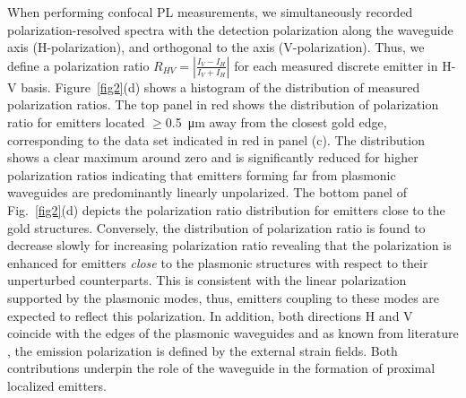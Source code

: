 \documentclass[journal=nalefd,manuscript=letter]{achemso}
\begin{document}
When performing confocal PL measurements, we simultaneously recorded polarization-resolved spectra with the detection polarization along the waveguide axis (H-polarization), and orthogonal to the axis (V-polarization).  Thus, we define a polarization ratio $R_{HV} = |\frac{I_V - I_H}{I_V + I_H}|$ for each measured discrete emitter in H-V basis.
Figure~\ref{fig2}(d) shows a histogram of the distribution of measured polarization ratios.
The top panel in red shows the distribution of polarization ratio for emitters located $\geq$\SI{0.5}{\micro\meter} away from the closest gold edge, corresponding to the data set indicated in red in panel (c).
The distribution shows a clear maximum around zero and is significantly reduced for higher polarization ratios indicating that emitters forming far from plasmonic waveguides are predominantly linearly unpolarized.
The bottom panel of Fig.~\ref{fig2}(d) depicts the polarization ratio distribution for emitters close to the gold structures.
Conversely, the distribution of polarization ratio is found to decrease slowly for increasing polarization ratio revealing that the polarization is enhanced for emitters \textit{close} to the plasmonic structures with respect to their unperturbed counterparts.
This is consistent with the linear polarization supported by the plasmonic modes, thus, emitters coupling to these modes are expected to reflect this polarization.
In addition, both directions H and V coincide with the edges of the plasmonic waveguides and as known from literature \cite{Kern.2016}, the emission polarization is defined by the external strain fields.
Both contributions underpin the role of the waveguide in the formation of proximal localized emitters.
\end{document}
